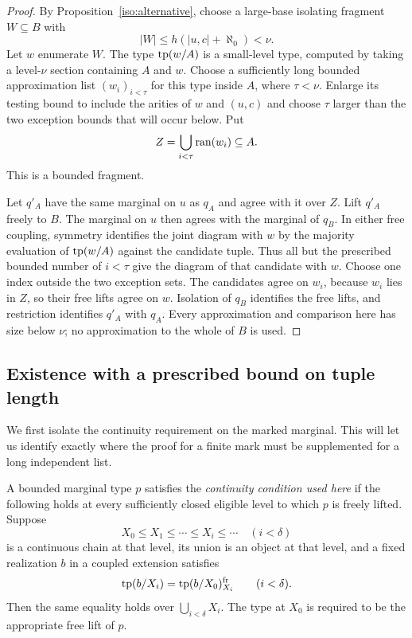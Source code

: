 \begin{proof}
By Proposition~\ref{iso:alternative}, choose a large-base isolating
fragment $W\subseteq B$ with
\[
 |W|\leq h(|u,c|+\aleph_0)<\nu.
\]
Let $w$ enumerate $W$. The type $\operatorname{tp}(w/A)$ is a small-level type,
computed by taking a level-$\nu$ section containing $A$ and $w$.
Choose a sufficiently long bounded approximation list $(w_i)_{i<\tau}$
for this type inside $A$, where $\tau<\nu$. Enlarge its testing bound
to include the arities of $w$ and $(u,c)$ and choose $\tau$ larger than
the two exception bounds that will occur below. Put
\[
 Z=\bigcup_{i<\tau}\operatorname{ran}(w_i)\subseteq A.
\]
This is a bounded fragment.

Let $q'_A$ have the same marginal on $u$ as $q_A$ and agree with it over
$Z$. Lift $q'_A$ freely to $B$. The marginal on $u$ then agrees with
the marginal of $q_B$. In either free coupling, symmetry identifies the
joint diagram with $w$ by the majority evaluation of $\operatorname{tp}(w/A)$ against
the candidate tuple. Thus all but the prescribed bounded number of
$i<\tau$ give the diagram of that candidate with $w$. Choose one index
outside the two exception sets. The candidates agree on $w_i$, because
$w_i$ lies in $Z$, so their free lifts agree on $w$. Isolation of $q_B$
identifies the free lifts, and restriction identifies $q'_A$ with $q_A$.
Every approximation and comparison here has size below $\nu$; no
approximation to the whole of $B$ is used.
\end{proof}

\subsection{Existence with a prescribed bound on tuple length}

We first isolate the continuity requirement on the marked marginal. This
will let us identify exactly where the proof for a finite mark must be
supplemented for a long independent list.

\begin{definition}\label{iso:marginal-continuity}
A bounded marginal type $p$ satisfies the \emph{continuity condition used
here} if the following holds at every sufficiently closed eligible level
to which $p$ is freely lifted. Suppose
\[
 X_0\leq X_1\leq\cdots\leq X_i\leq\cdots\quad(i<\delta)
\]
is a continuous chain at that level, its union is an object at that level,
and a fixed realization $b$ in a coupled extension satisfies
\[
 \operatorname{tp}(b/X_i)=\operatorname{tp}(b/X_0)^{\mathrm{fr}}_{X_i}
 \qquad(i<\delta).
\]
Then the same equality holds over $\bigcup_{i<\delta}X_i$.
The type at $X_0$ is required to be the appropriate free lift of $p$.
\end{definition}

